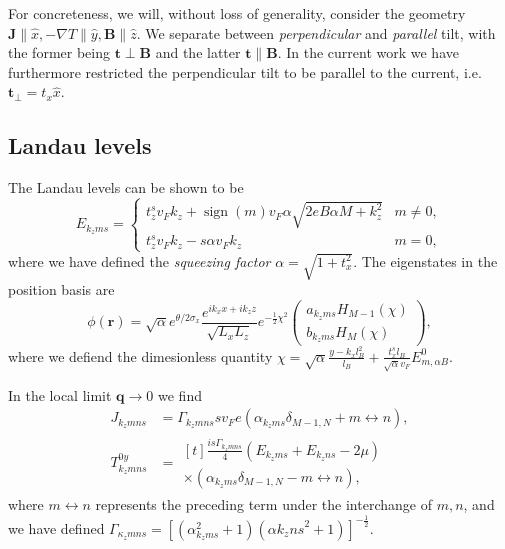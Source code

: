 \documentclass[%
 reprint,
 amsmath,amssymb,
 aps,
]{revtex4-2}
\renewcommand\vec\bm  %
\DeclareMathOperator\sign{sign}
\begin{document}
For concreteness, we will, without loss of generality, consider the geometry \( \vec{J} \parallel \hat{x}, -\nabla T \parallel \hat{y}, \vec{B} \parallel \hat{z} \).
We separate between \emph{perpendicular} and \emph{parallel} tilt, with the former being \( \vec{t} \perp \vec{B}
\) and the latter \( \vec{t} \parallel \vec{B} \).
In the current work we have furthermore restricted the perpendicular tilt to be parallel to the current, i.e. \( \vec{t}_{\perp} = t_x \hat{x} \).

\subsection{Landau levels}
The Landau levels can be shown to be
\begin{equation}
  \label{eq:eigenlevels}
  E_{k_z m s} =
  \begin{cases}
    t_z^s v_F k_z + \sign(m) v_F \alpha \sqrt{2 e B \alpha M + k_z^2} & m \neq 0,\\
    t_z^s v_F k_z - s \alpha v_F k_z & m = 0,
  \end{cases}
\end{equation}
where we have defined the \emph{squeezing factor} \( \alpha = \sqrt{1 + t_x^2} \).
The eigenstates in the position basis are
\begin{equation}
  \label{eq:eigenstates}
  \phi(\vec{r}) = \sqrt{\alpha} e^{\theta / 2 \sigma_x} \frac{e^{i k_x x + ik_z z }}{\sqrt{L_{x} L_{z}}} e^{- \frac{1}{2} \chi^2}
  \begin{pmatrix}
    a_{k_z m s} H_{M-1} (\chi)\\
    b_{k_z m s} H_M (\chi)
  \end{pmatrix},
\end{equation}
where we defiend the dimesionless quantity \( \chi = \sqrt{\alpha} \frac{y-k_{x}l_B^2}{l_{B}} + \frac{t_x^s l_B}{\sqrt{\alpha} v_{F}} E^0_{m, \alpha B} \).

In the local limit \( \vec{q} \to 0 \) we find
\begin{align}
  \label{eq:1}
  J_{k_z m n s} &= \Gamma_{k_z m n s} s v_F e ( \alpha_{k_z m s } \delta_{M-1, N} + m \leftrightarrow n),\\
  T_{k_z m n s}^{0y} &=
                       \begin{multlined}[t]
                         \frac{i s \Gamma_{k_z m n s}}{4} (E_{k_z m s} + E_{k_z n s} - 2 \mu )\\
                         \times (\alpha_{k_z m s} \delta_{M-1, N} - m \leftrightarrow n),
                       \end{multlined}
\end{align}
where \( m \leftrightarrow n  \) represents the preceding term under the interchange of \( m,n \), and we have defined \( \Gamma_{\kappa_z m n s} = \left[(\alpha_{k_z m s}^2 + 1) (\alpha{k_z n s}^2 + 1)\right]^{-\frac{1}{2}} \).
\end{document}
